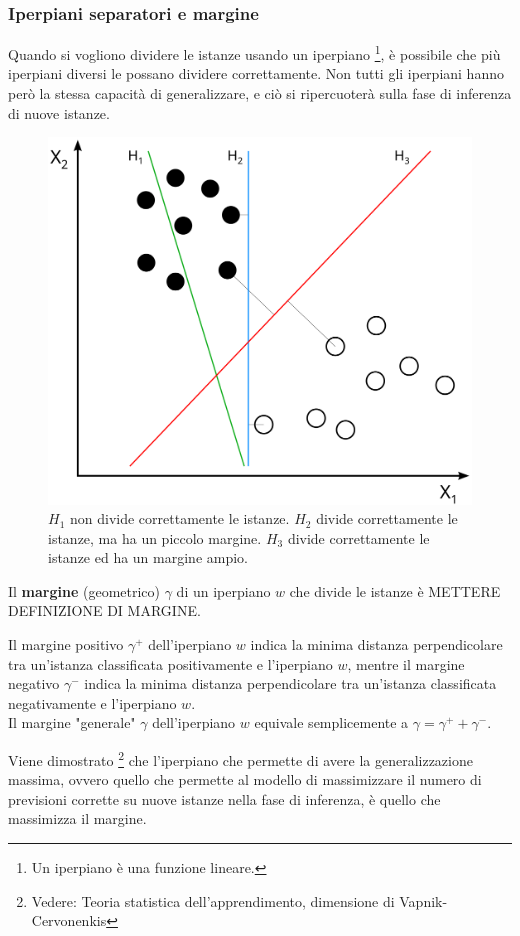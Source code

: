 \subsubsection{Iperpiani separatori e margine}
Quando si vogliono dividere le istanze usando un iperpiano \footnote{Un iperpiano è una funzione lineare.}, è possibile che più iperpiani diversi le possano dividere correttamente.
Non tutti gli iperpiani hanno però la stessa capacità di generalizzare, e ciò si ripercuoterà sulla fase di inferenza di nuove istanze.
\begin{figure}[h]
    \centering
    \includegraphics[width=0.5\linewidth]{img/hyperplanes.png}
    \caption{$H_1$ non divide correttamente le istanze. $H_2$ divide correttamente le istanze, ma ha un piccolo margine. $H_3$ divide correttamente le istanze ed ha un margine ampio.}
    \label{fig:svm_margin}
\end{figure}
\begin{defn}
    Il \textbf{margine} (geometrico) $\gamma$ di un iperpiano $w$ che divide le istanze è METTERE DEFINIZIONE DI MARGINE. 

    Il margine positivo $\gamma^+$ dell'iperpiano $w$ indica la minima distanza perpendicolare tra un'istanza classificata positivamente e l'iperpiano $w$, mentre il margine negativo $\gamma^-$ indica la minima distanza perpendicolare tra un'istanza classificata negativamente e l'iperpiano $w$.\\
    Il margine "generale" $\gamma$ dell'iperpiano $w$ equivale semplicemente a $\gamma = \gamma^+ + \gamma^-$.
\end{defn}
Viene dimostrato \footnote{Vedere: Teoria statistica dell'apprendimento, dimensione di Vapnik-Cervonenkis} che l'iperpiano che permette di avere la generalizzazione massima, ovvero quello che permette al modello di massimizzare il numero di previsioni corrette su nuove istanze nella fase di inferenza, è quello che massimizza il margine.

